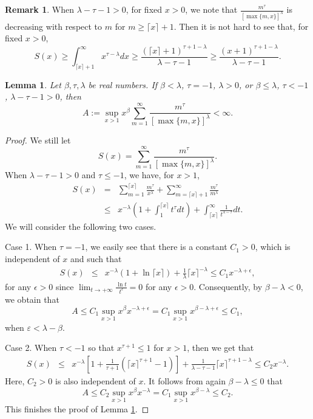 \documentclass[10pt]{amsart}
\newtheorem{lemma}[theorem]{Lemma}
\theoremstyle{definition}    %
\newtheorem{remark}[theorem]{Remark}
\numberwithin{equation}{section}
\begin{document}
\begin{remark}\label{f-re}When $\lambda-\tau-1>0$, for fixed $x>0$, we note that $\frac{m^{\tau}}{[\max\{m,x\}]^{\lambda}}$ is decreasing with respect to $m$ for $m\geq\lceil x \rceil+1$. 
Then it is not hard to see that, for fixed $x>0$,
$$  
S(x)\geq \int_{\lceil x \rceil+1}^{\infty}x^{\tau-\lambda}dx\geq \frac{(\lceil x \rceil+1)^{\tau+1-\lambda}}{\lambda-\tau-1}\geq \frac{(x+1)^{\tau+1-\lambda}}{\lambda-\tau-1}.$$
\end{remark}

\begin{lemma}\label{ll-5-1}Let $\beta, \tau, \lambda$ be real numbers. 
 If $\beta<\lambda$, $\tau=-1$, $\lambda>0$, or $\beta \leq \lambda$, $\tau<-1$, $\lambda-\tau-1>0$, then 
 $$A:=\sup_{x>1}x^{\beta}\sum_{m=1}^{\infty}\frac{m^{\tau}}{[\max\{m,x\}]^{\lambda}}<\infty.$$
\end{lemma}
\begin{proof}
We still let
$$S(x)=\sum_{m=1}^{\infty}\frac{m^{\tau}}{[\max\{m,x\}]^{\lambda}}.$$
When $\lambda-\tau-1>0$ and $\tau\leq -1$, we have, for $x>1$, 
\begin{eqnarray}\label{s-3}
S(x)&=&\sum_{m=1}^{\lceil x \rceil}\frac{m^{\tau}}{x^{\lambda}}+\sum_{m=\lceil x \rceil+1}^{\infty}\frac{m^{\tau}}{m^{\lambda}}\nonumber \\
&\leq& x^{-\lambda}(1+\int_{1}^{\lceil x \rceil}t^{\tau}dt)+\int_{\lceil x \rceil}^{\infty}\frac{1}{t^{\lambda-\tau}}dt.\nonumber 
\end{eqnarray}
We will consider the following two cases. 

Case 1. When $\tau=-1$, we easily see that there is a constant $C_1>0$, which is independent of $x$ and such that 
 \begin{eqnarray}\label{s-4}
S(x)&\leq& x^{-\lambda}(1+\ln\lceil x \rceil)+\frac{1}{\lambda}\lceil x \rceil^{-\lambda}\leq C_1 x^{-\lambda+\epsilon},\nonumber
\end{eqnarray}
for any $\epsilon>0$ since $\lim_{t\rightarrow +\infty}\frac{\ln t}{t^{\epsilon}}=0$ for any $\epsilon>0$. Consequently, by $\beta-\lambda<0$, we obtain that
$$A\leq C_1\sup_{x>1}x^{\beta}{x^{-\lambda+\epsilon}}=C_1\sup_{x>1}{x^{\beta-\lambda+\epsilon}}\leq C_1,$$
when $\varepsilon<\lambda-\beta$.

Case 2. When $\tau<-1$ so that $x^{\tau+1}\leq 1$ for $x>1$, then we get that 
 \begin{eqnarray}\label{s-4}
S(x)&\leq& x^{-\lambda}[1+\frac{1}{\tau+1}(\lceil x \rceil^{\tau+1}-1)]+\frac{1}{\lambda-\tau-1}\lceil x \rceil^{\tau+1-\lambda}\leq C_2 x^{-\lambda}.\nonumber
\end{eqnarray}
Here, $C_2>0$ is also independent of $x$. It follows from again $\beta-\lambda\leq 0$ that
$$A\leq C_2\sup_{x>1}x^{\beta}{x^{-\lambda}}=C_1\sup_{x>1}{x^{\beta-\lambda}}\leq C_2.$$
This finishes the proof of Lemma \ref{ll-5-1}.
\end{proof}
 
\end{document}
